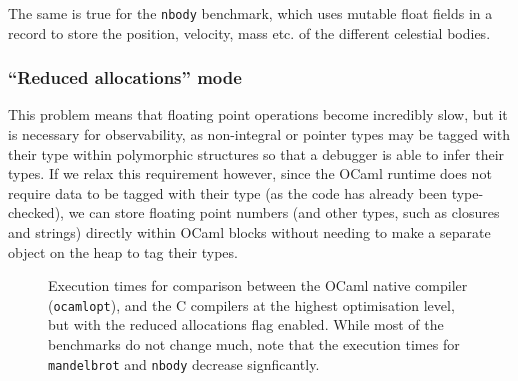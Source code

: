 \documentclass[12pt,a4paper,twoside,openright]{report}
\begin{document}
The same is true for the \texttt{nbody} benchmark, which uses mutable float 
fields in a record to store the position, velocity, mass etc. of the different 
celestial bodies.

\subsubsection{``Reduced allocations'' mode}

This problem means that floating point operations become incredibly slow, but 
it is necessary for observability, as non-integral or pointer types may be 
tagged with their type within polymorphic structures so that a debugger is able 
to infer their types. If we relax this requirement however, since the OCaml 
runtime does not require data to be tagged with their type (as the code has 
already been type-checked), we can store floating point numbers (and other 
types, such as closures and strings) directly within OCaml blocks without 
needing to make a separate object on the heap to tag their types.

\begin{figure}
    \label{fig:benchmarks-no-alloc}
    \centering
    \caption{Execution times for comparison between the OCaml native compiler 
    (\texttt{ocamlopt}), and the C compilers at the highest optimisation level, 
    but with the reduced allocations flag enabled. While most of the benchmarks 
    do not change much, note that the execution times for \texttt{mandelbrot} 
    and \texttt{nbody} decrease signficantly.}
\end{figure}
\end{document}
